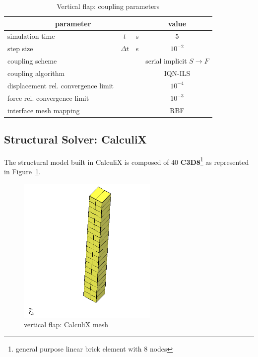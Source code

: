 \begin{table}[!htb]
	\begin{center}
		\begin{tabular}{ l c  l| c } 
			\multicolumn{3}{c|}{parameter} & value   \\ 
			\hline
			simulation time  & $t$& \si{s} & 5      \\
			step size & $\Delta t$ & \si{s} & $10^{-2}$   \\
			\hline
			coupling scheme & & & serial implicit  $S\rightarrow F$  \\
			coupling algorithm & & &  IQN-ILS  \\
			displacement rel. convergence limit & & & $10^{-4}$ \\
			force rel. convergence limit &&  & $10^{-3}$  \\
      		interface mesh mapping & & & RBF  \\
			
		\end{tabular}
	\end{center}
	\caption{Vertical flap: coupling parameters}
	\label{table:ex1-coupling}
\end{table}





\subsection{Structural Solver: CalculiX}

The structural model built in CalculiX is composed of 40 \textbf{C3D8}\footnote{general purpose linear brick element with 8 nodes} as represented in Figure~\ref{fig:cx-mesh}. 

\begin{figure}[htbp!]
	\centering
	\includegraphics[width=0.6\textwidth]{images/cx1}
	\caption{vertical flap: CalculiX mesh}
	\label{fig:cx-mesh}
\end{figure}

